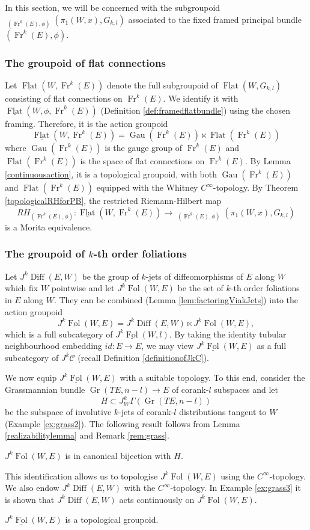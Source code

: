 \documentclass[10pt]{amsart}
\newcommand{\Gr}{\operatorname{Gr}}
\newcommand{\Diff}{{\operatorname{Diff}}}
\newcommand{\FolCat}{{\underline{\operatorname{Fol}}}}
\newcommand{\FolObj}{{\operatorname{Fol}}}
\newcommand{\FlatCat}{{\underline{\operatorname{Flat}}}}
\newcommand{\FlatObj}{{\operatorname{Flat}}}
\DeclareMathOperator{\Rep}{\underline{\operatorname{Rep}}}
\newcommand{\Fr}{{\operatorname{Fr}}}
\DeclareMathOperator{\Gau}{Gau}
\numberwithin{theoremalpha}{section}
\numberwithin{equation}{section}
\numberwithin{definition}{section}
\numberwithin{theorem}{section}
\numberwithin{proposition}{section}
\numberwithin{lemma}{section}
\numberwithin{example}{section}
\numberwithin{remark}{section}
\numberwithin{corollary}{section}
\numberwithin{question}{section}
\numberwithin{problem}{section}
\numberwithin{assumption}{section}
\theoremstyle{named}
\numberwithin{equation}{section}
\begin{document}
In this section, we will be concerned with the subgroupoid $\Rep_{(\Fr^k(E),\phi)}(\pi_{1}(W, x), G_{k,l})$ associated to the fixed framed principal bundle $(\Fr^k(E), \phi)$. 

\subsubsection{The groupoid of flat connections} \label{gpdflatcondefsec}

Let $\FlatCat(W, \Fr^{k}(E))$ denote the full subgroupoid of $\FlatCat(W, G_{k,l})$ consisting of flat connections on $\Fr^{k}(E)$. We identify it with $\FlatCat(W, \phi, \Fr^{k}(E))$ (Definition \ref{def:framedflatbundle}) using the chosen framing. Therefore, it is the action groupoid 
\[ \FlatCat(W, \Fr^{k}(E)) = \Gau(\Fr^k(E)) \ltimes \FlatObj(\Fr^k(E)) \]
where $\Gau(\Fr^k(E))$ is the gauge group of $\Fr^{k}(E)$ and $\FlatObj(\Fr^k(E))$ is the space of flat connections on $\Fr^{k}(E)$. By Lemma \ref{continuousaction}, it is a topological groupoid, with both $\Gau(\Fr^k(E))$ and $\FlatObj(\Fr^k(E))$ equipped with the Whitney $C^{\infty}$-topology. By Theorem \ref{topologicalRHforPB}, the restricted Riemann-Hilbert map 
\[
RH_{(\Fr^{k}(E), \phi)} : \FlatCat(W, \Fr^{k}(E)) \to \Rep_{(\Fr^k(E),\phi)}(\pi_{1}(W, x), G_{k,l}) 
\]
is a Morita equivalence. 

\subsubsection{The groupoid of $k$-th order foliations}  \label{gpdkjetfoldefsec}

Let $J^k\Diff(E,W)$ be the group of $k$-jets of diffeomorphisms of $E$ along $W$ which fix $W$ pointwise and let $J^{k}\FolObj(W,E)$ be the set of $k$-th order foliations in $E$ along $W$. They can be combined (Lemma \ref{lem:factoringViakJets}) into the action groupoid
\[ J^{k}\FolCat(W,E) = J^k\Diff(E,W) \ltimes J^{k}\FolObj(W,E), \]
which is a full subcategory of $J^{k}\FolCat(W,l)$. By taking the identity tubular neighbourhood embedding $id: E \to E$, we may view $J^{k}\FolCat(W,E)$ as a full subcategory of $J^k\mathcal{C}$ (recall Definition \ref{definitionofJkC}).

We now equip $J^{k}\FolCat(W,E)$ with a suitable topology. To this end, consider the Grassmannian bundle $\Gr(TE,n-l) \rightarrow E$ of corank-$l$ subspaces and let 
\[
H \subset J^k_W\Gamma(\Gr(TE,n-l))
\] be the subspace of involutive $k$-jets of corank-$l$ distributions tangent to $W$ (Example \ref{ex:grass2}). The following result follows from Lemma \ref{realizabilitylemma} and Remark \ref{rem:grass}. 
\begin{lemma}\label{lem:homeoWithFlat}
$J^{k}\FolObj(W,E)$ is in canonical bijection with $H$. 
\end{lemma}
This identification allows us to topologise $J^{k}\FolObj(W,E)$ using the $C^\infty$-topology. We also endow $J^k\Diff(E,W)$ with the $C^\infty$-topology. In Example \ref{ex:grass3} it is shown that  $J^k\Diff(E,W)$ acts continuously on $J^{k}\FolObj(W,E)$. 
\begin{corollary} \label{kjetfibrationproperty}
$J^{k}\FolCat(W,E)$ is a topological groupoid.
\end{corollary}
\end{document}
